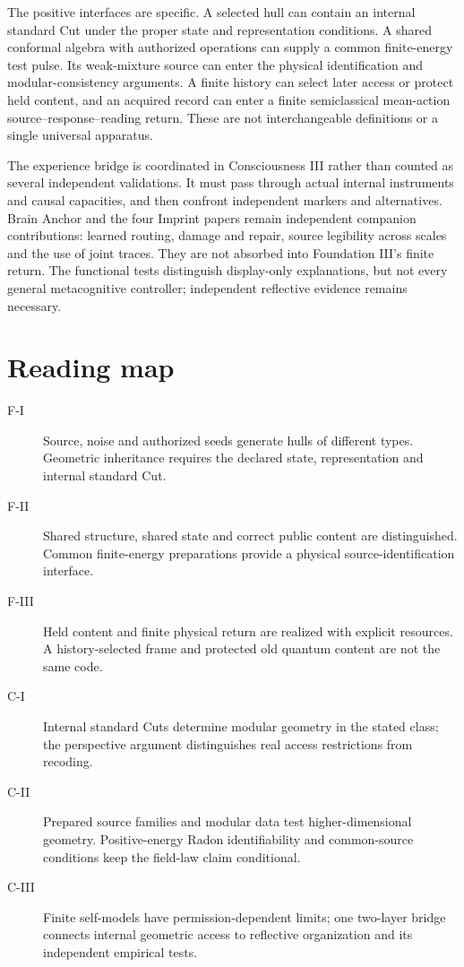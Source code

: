 \documentclass[11pt,a4paper]{article}
\begin{document}
The positive interfaces are specific. A selected hull can contain an internal standard Cut under the proper state and representation conditions. A shared conformal algebra with authorized operations can supply a common finite-energy test pulse. Its weak-mixture source can enter the physical identification and modular-consistency arguments. A finite history can select later access or protect held content, and an acquired record can enter a finite semiclassical mean-action source--response--reading return. These are not interchangeable definitions or a single universal apparatus.

The experience bridge is coordinated in Consciousness III rather than counted as several independent validations. It must pass through actual internal instruments and causal capacities, and then confront independent markers and alternatives. Brain Anchor and the four Imprint papers remain independent companion contributions: learned routing, damage and repair, source legibility across scales and the use of joint traces. They are not absorbed into Foundation III's finite return. The functional tests distinguish display-only explanations, but not every general metacognitive controller; independent reflective evidence remains necessary.

\section*{Reading map}
\begin{description}
\item[F-I] Source, noise and authorized seeds generate hulls of different types. Geometric inheritance requires the declared state, representation and internal standard Cut.
\item[F-II] Shared structure, shared state and correct public content are distinguished. Common finite-energy preparations provide a physical source-identification interface.
\item[F-III] Held content and finite physical return are realized with explicit resources. A history-selected frame and protected old quantum content are not the same code.
\item[C-I] Internal standard Cuts determine modular geometry in the stated class; the perspective argument distinguishes real access restrictions from recoding.
\item[C-II] Prepared source families and modular data test higher-dimensional geometry. Positive-energy Radon identifiability and common-source conditions keep the field-law claim conditional.
\item[C-III] Finite self-models have permission-dependent limits; one two-layer bridge connects internal geometric access to reflective organization and its independent empirical tests.
\end{description}
\end{document}
